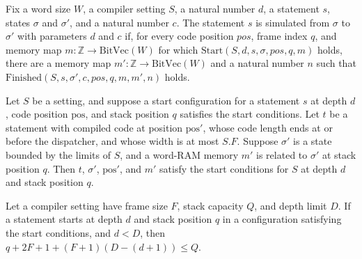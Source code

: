 \begin{definition}
\label{Light.Compiler.Simulates}
\leanok
{}
Fix a word size $W$, a compiler setting $S$, a natural number $d$, a statement $s$,
states $\sigma$ and $\sigma'$, and a natural number $c$. The statement $s$ is simulated
from $\sigma$ to $\sigma'$ with parameters $d$ and $c$ if, for every code position
$pos$, frame index $q$, and memory map $m : \mathbb{Z} \to \mathrm{BitVec}(W)$ for which
$\mathrm{Start}(S,d,s,\sigma,pos,q,m)$ holds, there are a memory map $m' : \mathbb{Z}
\to \mathrm{BitVec}(W)$ and a natural number $n$ such that
$\mathrm{Finished}(S,s,\sigma',c,pos,q,m,m',n)$ holds.
\end{definition}

\begin{theorem}
\label{Light.Compiler.Start.sub}
\leanok
{}
Let $S$ be a setting, and suppose a start configuration for a statement $s$ at depth
$d$, code position $\mathrm{pos}$, and stack position $q$ satisfies the start
conditions. Let $t$ be a statement with compiled code at position $\mathrm{pos}'$, whose
code length ends at or before the dispatcher, and whose width is at most $S.F$. Suppose
$\sigma'$ is a state bounded by the limits of $S$, and a word-RAM memory $m'$ is related
to $\sigma'$ at stack position $q$. Then $t$, $\sigma'$, $\mathrm{pos}'$, and $m'$
satisfy the start conditions for $S$ at depth $d$ and stack position $q$.
\end{theorem}

\begin{theorem}
\label{Light.Compiler.Start.room_succ}
\leanok
{}
Let a compiler setting have frame size $F$, stack capacity $Q$, and depth limit $D$. If
a statement starts at depth $d$ and stack position $q$ in a configuration satisfying the
start conditions, and $d<D$, then $q+2F+1+(F+1)(D-(d+1))\le Q$.
\end{theorem}


